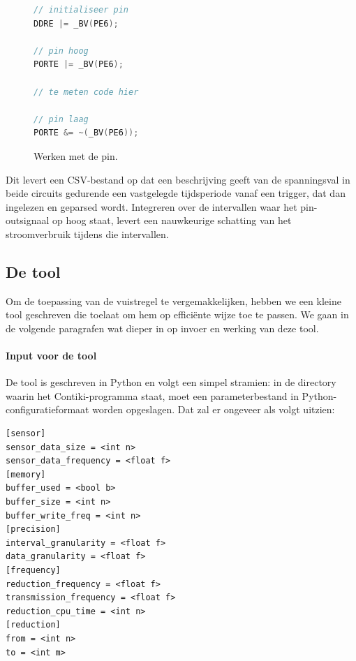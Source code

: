 \documentclass[11pt]{article}
\begin{document}
\begin{figure}[h]
\begin{lstlisting}[frame=single,language=C]
// initialiseer pin
DDRE |= _BV(PE6);

// pin hoog
PORTE |= _BV(PE6);

// te meten code hier

// pin laag
PORTE &= ~(_BV(PE6));
\end{lstlisting}
\caption{Werken met de pin.}
\label{fig:pin_flip_code}
\end{figure}


Dit levert een CSV-bestand op dat een beschrijving geeft van de spanningsval in
beide circuits gedurende een vastgelegde tijdsperiode vanaf een trigger, dat dan
ingelezen en geparsed wordt. Integreren over de intervallen waar het
pin-outsignaal op hoog staat, levert een nauwkeurige schatting van het
stroomverbruik tijdens die intervallen.

\subsection{De tool}

Om de toepassing van de vuistregel te vergemakkelijken, hebben we een kleine
tool geschreven die toelaat om hem op effici\"ente wijze toe te passen. We gaan
in de volgende paragrafen wat dieper in op invoer en werking van deze tool.

\paragraph{Input voor de tool}
De tool is geschreven in Python en volgt een simpel stramien: in de directory
waarin het Contiki-programma staat, moet een parameterbestand in
Python-configuratieformaat worden opgeslagen. Dat zal er ongeveer als volgt
uitzien:

\begin{verbatim}
[sensor]
sensor_data_size = <int n>
sensor_data_frequency = <float f>
[memory]
buffer_used = <bool b>
buffer_size = <int n>
buffer_write_freq = <int n>
[precision]
interval_granularity = <float f>
data_granularity = <float f>
[frequency]
reduction_frequency = <float f>
transmission_frequency = <float f>
reduction_cpu_time = <int n>
[reduction]
from = <int n>
to = <int m>
\end{verbatim}
\end{document}
